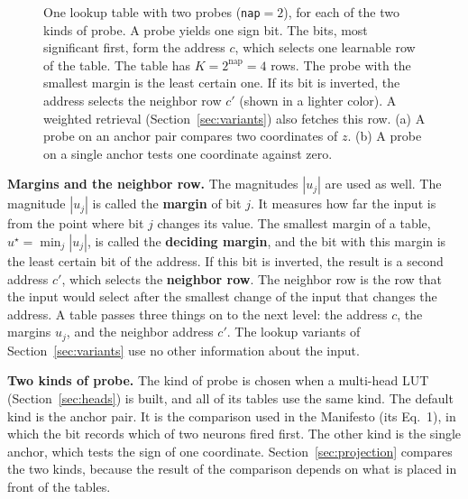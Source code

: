 \documentclass[11pt]{article}
\DeclareRobustCommand{\code}[1]{{\renewcommand{\_}{\textunderscore\allowbreak}\texttt{#1}}}
\newcommand{\term}[1]{\textbf{#1}}
\begin{document}
\begin{figure}[t]
{}
\caption{One lookup table with two probes (\code{nap}$=2$), for each of the two kinds of probe. A probe
yields one sign bit. The bits, most significant first, form the address $c$, which selects one learnable
row of the table. The table has $K=2^{\text{nap}}=4$ rows. The probe with the smallest margin is the least
certain one. If its bit is inverted, the address selects the neighbor row $c'$ (shown in a lighter
color). A weighted retrieval (Section~\ref{sec:variants}) also fetches this row. (a) A probe on an anchor pair compares two coordinates of
$z$. (b) A probe on a single anchor tests one coordinate against zero.}
\label{fig:table}
\end{figure}

\textbf{Margins and the neighbor row.} The magnitudes $|u_j|$ are used as well. The magnitude $|u_j|$
is called the \term{margin} of bit $j$. It measures how far the input is from the point where bit $j$
changes its value. The smallest margin of a table, $u^\star=\min_j|u_j|$, is called the \term{deciding
margin}, and the bit with this margin is the least certain bit of the address. If this bit is inverted,
the result is a second address $c'$, which selects the \term{neighbor row}. The neighbor row is the row
that the input would select after the smallest change of the input that changes the address. A table
passes three things on to the next level: the address $c$, the margins $u_j$, and the neighbor address
$c'$. The lookup variants of Section~\ref{sec:variants} use no other information about the input.

\textbf{Two kinds of probe.} The kind of probe is chosen when a multi-head LUT
(Section~\ref{sec:heads}) is built, and all of its tables use the same kind. The default kind is the
anchor pair. It is the comparison used in the Manifesto (its Eq.~1), in which the bit records which of
two neurons fired first. The other kind is the single anchor, which tests the sign of one coordinate.
Section~\ref{sec:projection} compares the two kinds, because the result of the comparison depends on what
is placed in front of the tables.
\end{document}
